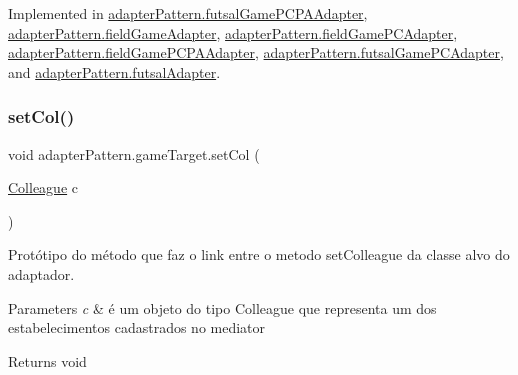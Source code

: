 Implemented in \mbox{\hyperlink{classadapter_pattern_1_1futsal_game_p_c_p_a_adapter_adbc71805ef1fab79c986d37ec9195a5b}{adapter\+Pattern.\+futsal\+Game\+P\+C\+P\+A\+Adapter}}, \mbox{\hyperlink{classadapter_pattern_1_1field_game_adapter_a4987c7e6aa3183a1c042f32432f1db8b}{adapter\+Pattern.\+field\+Game\+Adapter}}, \mbox{\hyperlink{classadapter_pattern_1_1field_game_p_c_adapter_afe12ddbea935f9a022cecbceab127307}{adapter\+Pattern.\+field\+Game\+P\+C\+Adapter}}, \mbox{\hyperlink{classadapter_pattern_1_1field_game_p_c_p_a_adapter_a94225ddf64c2d6a84d7ab6d8d2918d8c}{adapter\+Pattern.\+field\+Game\+P\+C\+P\+A\+Adapter}}, \mbox{\hyperlink{classadapter_pattern_1_1futsal_game_p_c_adapter_ac423dff95c8ec06729608750d9a01021}{adapter\+Pattern.\+futsal\+Game\+P\+C\+Adapter}}, and \mbox{\hyperlink{classadapter_pattern_1_1futsal_adapter_a63b50886ea0df5062fdeb086811c22ba}{adapter\+Pattern.\+futsal\+Adapter}}.

\mbox{\label{interfaceadapter_pattern_1_1game_target_ae4493af8f85c0459e4e628ffff3fe3b9}} 
\subsubsection{\texorpdfstring{setCol()}{setCol()}}
{\footnotesize\ttfamily void adapter\+Pattern.\+game\+Target.\+set\+Col (\begin{DoxyParamCaption}\item[{\mbox{\hyperlink{classmediator_pattern_1_1_colleague}{Colleague}}}]{c }\end{DoxyParamCaption})}



Protótipo do método que faz o link entre o metodo set\+Colleague da classe alvo do adaptador. 


\begin{DoxyParams}{Parameters}
{\em c} & é um objeto do tipo Colleague que representa um dos estabelecimentos cadastrados no mediator \\
\hline
\end{DoxyParams}
\begin{DoxyReturn}{Returns}
void 
\end{DoxyReturn}


